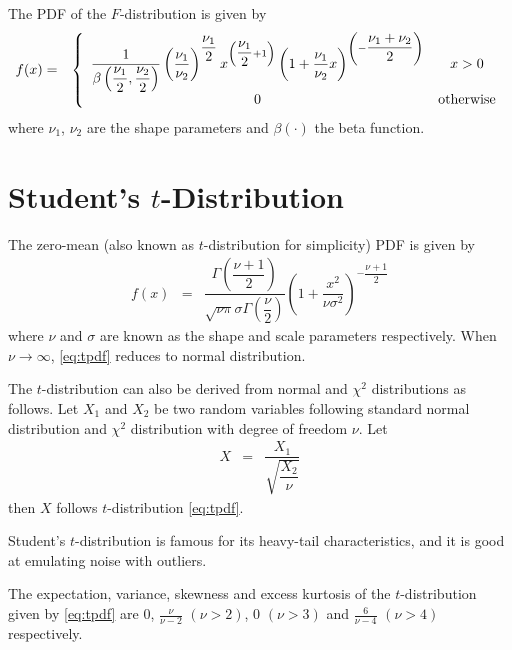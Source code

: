 The PDF of the $F$-distribution is given by
\begin{eqnarray}
	f(x) &=& \left\{\begin{array}{cc}
		\dfrac{1}{\beta\left(\dfrac{\nu_1}{2},\dfrac{\nu_2}{2}\right)}\left(\dfrac{\nu_1}{\nu_2}\right)^{\dfrac{\nu_1}{2}}x^{\left(\dfrac{\nu_1}{2}+1\right)}\left(1+\dfrac{\nu_1}{\nu_2}x\right)^{\left(-\dfrac{\nu_1 + \nu_2}{2}\right)} & x > 0 \\
		0 & \textup{otherwise}
	\end{array}\right. \nonumber
\end{eqnarray}
where $\nu_1$, $\nu_2$ are the shape parameters and $\beta(\cdot)$ the beta function. 

\section{Student's $t$-Distribution}

The zero-mean  (also known as $t$-distribution for simplicity) PDF is given by
\begin{eqnarray}
	f(x) &=& \dfrac{\Gamma\left(\dfrac{\nu+1}{2}\right)}{\sqrt{\nu\pi}\sigma\Gamma\left(\dfrac{\nu}{2}\right)}\left(1+\dfrac{x^2}{\nu\sigma^2}\right)^{-\dfrac{\nu+1}{2}} \label{eq:tpdf}
\end{eqnarray}
where $\nu$ and $\sigma$ are known as the shape and scale parameters respectively. When $\nu\rightarrow\infty$, \eqref{eq:tpdf} reduces to normal distribution. 

The $t$-distribution can also be derived from normal and $\chi^2$ distributions as follows. Let $X_1$ and $X_2$ be two random variables following standard normal distribution and $\chi^2$ distribution with degree of freedom $\nu$. Let
\begin{eqnarray}
	X &=& \dfrac{X_1}{\sqrt{\dfrac{X_2}{\nu}}} \nonumber
\end{eqnarray}
then $X$ follows $t$-distribution \eqref{eq:tpdf}.

Student's $t$-distribution is famous for its heavy-tail characteristics, and it is good at emulating noise with outliers.

The expectation, variance, skewness and excess kurtosis of the $t$-distribution given by \eqref{eq:tpdf} are $0$, $\frac{\nu}{\nu-2}$ $(\nu>2)$, $0$ $(\nu>3)$ and $\frac{6}{\nu-4}$ $(\nu>4)$ respectively.

